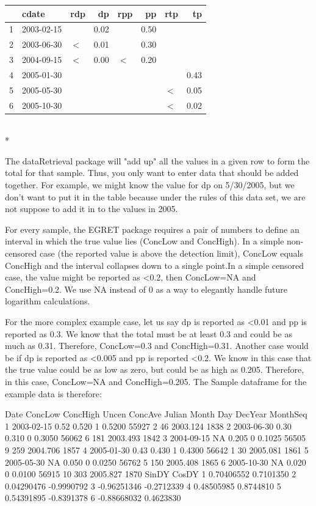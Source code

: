 \documentclass[a4paper,11pt]{article}
\begin{document}
\begin{tabular}{rllrlrlr}
  \hline
 & cdate & rdp & dp & rpp & pp & rtp & tp \\ 
  \hline
1 & 2003-02-15 &  & 0.02 &  & 0.50 &  &  \\ 
  2 & 2003-06-30 & $<$ & 0.01 &  & 0.30 &  &  \\ 
  3 & 2004-09-15 & $<$ & 0.00 & $<$ & 0.20 &  &  \\ 
  4 & 2005-01-30 &  &  &  &  &  & 0.43 \\ 
  5 & 2005-05-30 &  &  &  &  & $<$ & 0.05 \\ 
  6 & 2005-10-30 &  &  &  &  & $<$ & 0.02 \\ 
   \hline
\end{tabular}\\*

The dataRetrieval package will "add up" all the values in a given row to form the total for that sample. Thus, you only want to enter data that should be added together. For example, we might know the value for dp on 5/30/2005, but we don't want to put it in the table because under the rules of this data set, we are not suppose to add it in to the values in 2005.

For every sample, the EGRET package requires a pair of numbers to define an interval in which the true value lies (ConcLow and ConcHigh). In a simple non-censored case (the reported value is above the detection limit), ConcLow equals ConcHigh and the interval collapses down to a single point.In a simple censored case, the value might be reported as <0.2, then ConcLow=NA and ConcHigh=0.2. We use NA instead of 0 as a way to elegantly handle future logarithm calculations.

For the more complex example case, let us say dp is reported as <0.01 and pp is reported as 0.3. We know that the total must be at least 0.3 and could be as much as 0.31. Therefore, ConcLow=0.3 and ConcHigh=0.31. Another case would be if dp is reported as <0.005 and pp is reported <0.2. We know in this case that the true value could be as low as zero, but could be as high as 0.205. Therefore, in this case, ConcLow=NA and ConcHigh=0.205. The Sample dataframe for the example data is therefore:

\begin{Schunk}
\begin{Soutput}
        Date ConcLow ConcHigh Uncen ConcAve Julian Month Day  DecYear MonthSeq
1 2003-02-15    0.52    0.520     1  0.5200  55927     2  46 2003.124     1838
2 2003-06-30    0.30    0.310     0  0.3050  56062     6 181 2003.493     1842
3 2004-09-15      NA    0.205     0  0.1025  56505     9 259 2004.706     1857
4 2005-01-30    0.43    0.430     1  0.4300  56642     1  30 2005.081     1861
5 2005-05-30      NA    0.050     0  0.0250  56762     5 150 2005.408     1865
6 2005-10-30      NA    0.020     0  0.0100  56915    10 303 2005.827     1870
        SinDY      CosDY
1  0.70406552  0.7101350
2  0.04290476 -0.9990792
3 -0.96251346 -0.2712339
4  0.48505985  0.8744810
5  0.54391895 -0.8391378
6 -0.88668032  0.4623830
\end{Soutput}
\end{Schunk}
\end{document}
